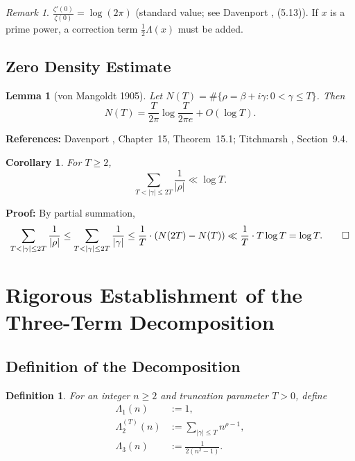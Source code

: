 \documentclass[11pt,a4paper]{article}
\newtheorem{lemma}[theorem]{Lemma}
\newtheorem{corollary}[theorem]{Corollary}
\newtheorem{definition}[theorem]{Definition}
\theoremstyle{remark}
\newtheorem{remark}[theorem]{Remark}
\begin{document}
\begin{remark}\label{rem:zeta0}
$\frac{\zeta'(0)}{\zeta(0)} = \log(2\pi)$ (standard value; see Davenport \cite{davenport}, (5.13)). If $x$ is a prime power, a correction term $\frac{1}{2}\Lambda(x)$ must be added.
\end{remark}

\subsection{Zero Density Estimate}

\begin{lemma}[von Mangoldt 1905]\label{lem:NT}
Let $N(T) = \#\{\rho = \beta + i\gamma : 0 < \gamma \leq T\}$. Then
\begin{equation}\label{eq:NT}
N(T) = \frac{T}{2\pi}\log\frac{T}{2\pi e} + O(\log T).
\end{equation}
\end{lemma}

\noindent\textbf{References:} Davenport \cite{davenport}, Chapter~15, Theorem~15.1; Titchmarsh \cite{titchmarsh}, Section~9.4.

\begin{corollary}\label{cor:zerosum}
For $T \geq 2$,
\begin{equation}\label{eq:zerosum}
\sum_{T < |\gamma| \leq 2T} \frac{1}{|\rho|} \ll \log T.
\end{equation}
\end{corollary}

\noindent\textbf{Proof:} By partial summation,
\[
\sum_{T < |\gamma| \leq 2T} \frac{1}{|\rho|} \leq \sum_{T < |\gamma| \leq 2T} \frac{1}{|\gamma|} \leq \frac{1}{T}\cdot (N(2T) - N(T)) \ll \frac{1}{T}\cdot T\log T = \log T. \qed
\]

\section{Rigorous Establishment of the Three-Term Decomposition}

\subsection{Definition of the Decomposition}

\begin{definition}\label{def:decomp}
For an integer $n \geq 2$ and truncation parameter $T > 0$, define
\begin{align}
\Lambda_1(n) &:= 1, \label{eq:L1}\\
\Lambda_2^{(T)}(n) &:= \sum_{|\gamma| \leq T} n^{\rho - 1}, \label{eq:L2}\\
\Lambda_3(n) &:= \frac{1}{2(n^2 - 1)}. \label{eq:L3}
\end{align}
\end{definition}
\end{document}
